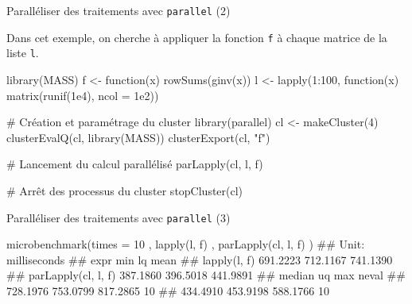 \documentclass[12pt,ignorenonframetext,]{beamer}
\newenvironment{Shaded}{}{}
\newcommand{\KeywordTok}[1]{\textcolor[rgb]{0.00,0.00,1.00}{#1}}
\newcommand{\DataTypeTok}[1]{#1}
\newcommand{\DecValTok}[1]{#1}
\newcommand{\FloatTok}[1]{#1}
\newcommand{\StringTok}[1]{\textcolor[rgb]{0.00,0.50,0.50}{#1}}
\newcommand{\CommentTok}[1]{\textcolor[rgb]{0.00,0.50,0.00}{#1}}
\newcommand{\ControlFlowTok}[1]{\textcolor[rgb]{0.00,0.00,1.00}{#1}}
\newcommand{\OperatorTok}[1]{#1}
\newcommand{\NormalTok}[1]{#1}
\renewenvironment{Shaded}{\begin{snugshade}}{\end{snugshade}}
\begin{document}
\begin{frame}[fragile]{\large Paralléliser des traitements avec
\texttt{parallel} (2)}

Dans cet exemple, on cherche à appliquer la fonction \texttt{f} à chaque
matrice de la liste \texttt{l}.

\pause \footnotesize

\begin{Shaded}
\begin{Highlighting}[]
\KeywordTok{library}\NormalTok{(MASS)}
\NormalTok{f <-}\StringTok{ }\ControlFlowTok{function}\NormalTok{(x) }\KeywordTok{rowSums}\NormalTok{(}\KeywordTok{ginv}\NormalTok{(x))}
\NormalTok{l <-}\StringTok{ }\KeywordTok{lapply}\NormalTok{(}\DecValTok{1}\OperatorTok{:}\DecValTok{100}\NormalTok{, }\ControlFlowTok{function}\NormalTok{(x) }\KeywordTok{matrix}\NormalTok{(}\KeywordTok{runif}\NormalTok{(}\FloatTok{1e4}\NormalTok{), }\DataTypeTok{ncol =} \FloatTok{1e2}\NormalTok{))}

\CommentTok{# Création et paramétrage du cluster}
\KeywordTok{library}\NormalTok{(parallel)}
\NormalTok{cl <-}\StringTok{ }\KeywordTok{makeCluster}\NormalTok{(}\DecValTok{4}\NormalTok{)}
\KeywordTok{clusterEvalQ}\NormalTok{(cl, }\KeywordTok{library}\NormalTok{(MASS))}
\KeywordTok{clusterExport}\NormalTok{(cl, }\StringTok{"f"}\NormalTok{)}

\CommentTok{# Lancement du calcul parallélisé}
\KeywordTok{parLapply}\NormalTok{(cl, l, f)}

\CommentTok{# Arrêt des processus du cluster}
\KeywordTok{stopCluster}\NormalTok{(cl)}
\end{Highlighting}
\end{Shaded}

\end{frame}

\begin{frame}[fragile]{\large Paralléliser des traitements avec
\texttt{parallel} (3)}

\pause 

\begin{Shaded}
\begin{Highlighting}[]
\KeywordTok{microbenchmark}\NormalTok{(}\DataTypeTok{times =} \DecValTok{10}
\NormalTok{  , }\KeywordTok{lapply}\NormalTok{(l, f)}
\NormalTok{  , }\KeywordTok{parLapply}\NormalTok{(cl, l, f)}
\NormalTok{)}
\NormalTok{  ## Unit: milliseconds}
\NormalTok{  ##                 expr      min       lq     mean}
\NormalTok{  ##         lapply(l, f) 691.2223 712.1167 741.1390}
\NormalTok{  ##  parLapply(cl, l, f) 387.1860 396.5018 441.9891}
\NormalTok{  ##    median       uq      max neval}
\NormalTok{  ##  728.1976 753.0799 817.2865    10}
\NormalTok{  ##  434.4910 453.9198 588.1766    10}
\end{Highlighting}
\end{Shaded}

\pause 

\end{frame}
\end{document}
